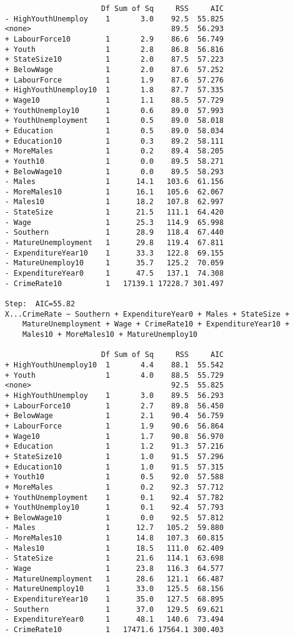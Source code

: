 \documentclass[11pt]{article}
\begin{document}
\begin{enumerate}
\begin{verbatim}
                      Df Sum of Sq     RSS     AIC
- HighYouthUnemploy    1       3.0    92.5  55.825
<none>                                89.5  56.293
+ LabourForce10        1       2.9    86.6  56.749
+ Youth                1       2.8    86.8  56.816
+ StateSize10          1       2.0    87.5  57.223
+ BelowWage            1       2.0    87.6  57.252
+ LabourForce          1       1.9    87.6  57.276
+ HighYouthUnemploy10  1       1.8    87.7  57.335
+ Wage10               1       1.1    88.5  57.729
+ YouthUnemploy10      1       0.6    89.0  57.993
+ YouthUnemployment    1       0.5    89.0  58.018
+ Education            1       0.5    89.0  58.034
+ Education10          1       0.3    89.2  58.111
+ MoreMales            1       0.2    89.4  58.205
+ Youth10              1       0.0    89.5  58.271
+ BelowWage10          1       0.0    89.5  58.293
- Males                1      14.1   103.6  61.156
- MoreMales10          1      16.1   105.6  62.067
- Males10              1      18.2   107.8  62.997
- StateSize            1      21.5   111.1  64.420
- Wage                 1      25.3   114.9  65.998
- Southern             1      28.9   118.4  67.440
- MatureUnemployment   1      29.8   119.4  67.811
- ExpenditureYear10    1      33.3   122.8  69.155
- MatureUnemploy10     1      35.7   125.2  70.059
- ExpenditureYear0     1      47.5   137.1  74.308
- CrimeRate10          1   17139.1 17228.7 301.497

Step:  AIC=55.82
X...CrimeRate ~ Southern + ExpenditureYear0 + Males + StateSize + 
    MatureUnemployment + Wage + CrimeRate10 + ExpenditureYear10 + 
    Males10 + MoreMales10 + MatureUnemploy10

                      Df Sum of Sq     RSS     AIC
+ HighYouthUnemploy10  1       4.4    88.1  55.542
+ Youth                1       4.0    88.5  55.729
<none>                                92.5  55.825
+ HighYouthUnemploy    1       3.0    89.5  56.293
+ LabourForce10        1       2.7    89.8  56.450
+ BelowWage            1       2.1    90.4  56.759
+ LabourForce          1       1.9    90.6  56.864
+ Wage10               1       1.7    90.8  56.970
+ Education            1       1.2    91.3  57.216
+ StateSize10          1       1.0    91.5  57.296
+ Education10          1       1.0    91.5  57.315
+ Youth10              1       0.5    92.0  57.588
+ MoreMales            1       0.2    92.3  57.712
+ YouthUnemployment    1       0.1    92.4  57.782
+ YouthUnemploy10      1       0.1    92.4  57.793
+ BelowWage10          1       0.0    92.5  57.812
- Males                1      12.7   105.2  59.880
- MoreMales10          1      14.8   107.3  60.815
- Males10              1      18.5   111.0  62.409
- StateSize            1      21.6   114.1  63.698
- Wage                 1      23.8   116.3  64.577
- MatureUnemployment   1      28.6   121.1  66.487
- MatureUnemploy10     1      33.0   125.5  68.156
- ExpenditureYear10    1      35.0   127.5  68.895
- Southern             1      37.0   129.5  69.621
- ExpenditureYear0     1      48.1   140.6  73.494
- CrimeRate10          1   17471.6 17564.1 300.403


\end{verbatim}
\end{enumerate}
\end{document}
